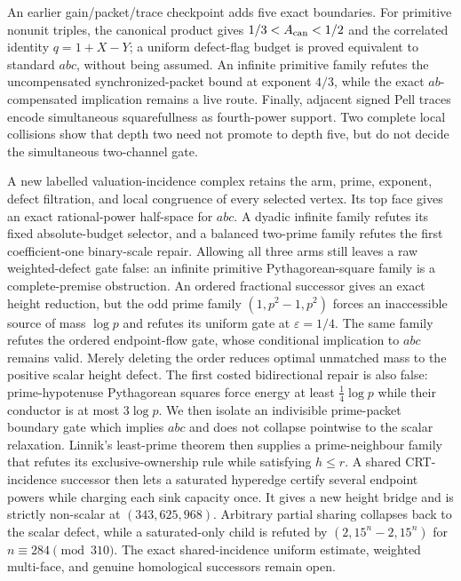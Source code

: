 \documentclass[11pt]{amsart}
\theoremstyle{definition}
\theoremstyle{remark}
\newcommand{\eps}{\varepsilon}
\begin{document}
An earlier gain/packet/trace checkpoint adds five exact boundaries.  For primitive nonunit
triples, the canonical product gives
$1/3<A_{\rm can}<1/2$ and the correlated identity
$q=1+X-Y$; a uniform defect-flag budget is proved equivalent to standard
$abc$, without being assumed.  An infinite primitive family refutes the
uncompensated synchronized-packet bound at exponent $4/3$, while the exact
$ab$-compensated implication remains a live route.  Finally, adjacent signed
Pell traces encode simultaneous squarefullness as fourth-power support.  Two
complete local collisions show that depth two need not promote to depth five,
but do not decide the simultaneous two-channel gate.

A new labelled valuation-incidence complex retains the arm, prime, exponent,
defect filtration, and local congruence of every selected vertex.  Its top
face gives an exact rational-power half-space for $abc$.  A dyadic infinite
family refutes its fixed absolute-budget selector, and a balanced two-prime
family refutes the first coefficient-one binary-scale repair.  Allowing all
three arms still leaves a raw weighted-defect gate false: an infinite
primitive Pythagorean-square family is a complete-premise obstruction.  An
ordered fractional successor gives an exact height reduction, but the odd
prime family $(1,p^2-1,p^2)$ forces an inaccessible source of mass $\log p$
and refutes its uniform gate at $\eps=1/4$.  The same family refutes the
ordered endpoint-flow gate, whose conditional implication to $abc$ remains
valid.  Merely deleting the order reduces optimal unmatched mass to the
positive scalar height defect.  The first costed bidirectional repair is also
false: prime-hypotenuse Pythagorean squares force energy at least
$\frac14\log p$ while their conductor is at most $3\log p$.  We then isolate
an indivisible prime-packet boundary gate which implies $abc$ and does not
collapse pointwise to the scalar relaxation.  Linnik's least-prime theorem
then supplies a prime-neighbour family that refutes its exclusive-ownership
rule while satisfying $h\le r$.  A shared CRT-incidence successor then lets a
saturated hyperedge certify several endpoint powers while charging each sink
capacity once.  It gives a new height bridge and is strictly non-scalar at
$(343,625,968)$.  Arbitrary partial sharing collapses back to the scalar
defect, while a saturated-only child is refuted by
$(2,15^n-2,15^n)$ for $n\equiv284\pmod {310}$.  The exact shared-incidence
uniform estimate, weighted multi-face, and genuine homological successors
remain open.
\end{document}
